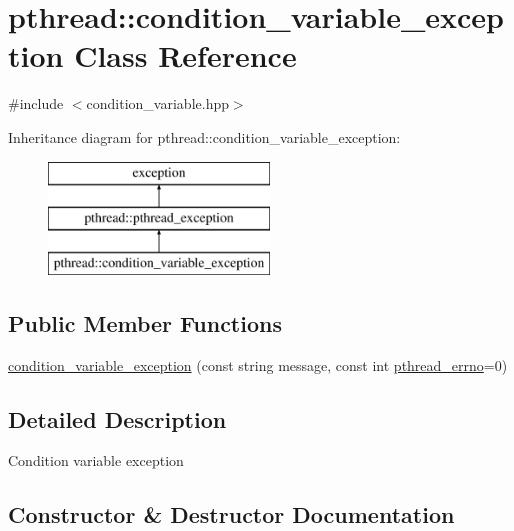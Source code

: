 \hypertarget{classpthread_1_1condition__variable__exception}{}\section{pthread\+:\+:condition\+\_\+variable\+\_\+exception Class Reference}
\label{classpthread_1_1condition__variable__exception}


{\ttfamily \#include $<$condition\+\_\+variable.\+hpp$>$}

Inheritance diagram for pthread\+:\+:condition\+\_\+variable\+\_\+exception\+:\begin{figure}[H]
\begin{center}
\leavevmode
\includegraphics[height=3.000000cm]{classpthread_1_1condition__variable__exception}
\end{center}
\end{figure}
\subsection*{Public Member Functions}
\begin{DoxyCompactItemize}
\item 
\hyperlink{classpthread_1_1condition__variable__exception_a00dd4b86da3021ae39baff18c6b5e0fc}{condition\+\_\+variable\+\_\+exception} (const string message, const int \hyperlink{classpthread_1_1pthread__exception_a4a869173054faca1945ac1a7729082d6}{pthread\+\_\+errno}=0)
\end{DoxyCompactItemize}


\subsection{Detailed Description}
Condition variable exception 

\subsection{Constructor \& Destructor Documentation}
